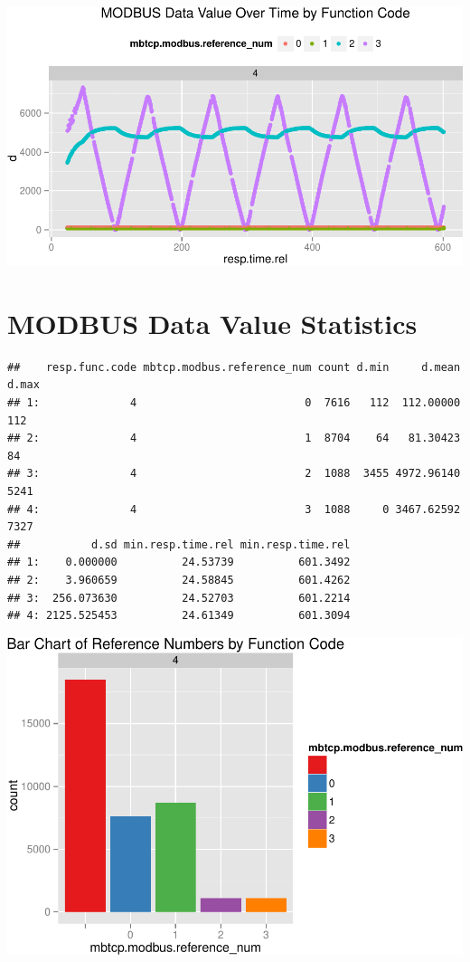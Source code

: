 \documentclass[]{article}
\begin{document}
\includegraphics{modbus_files/figure-latex/unnamed-chunk-17-1.pdf}

\pagebreak

\section{MODBUS Data Value
Statistics}\label{modbus-data-value-statistics}

\begin{verbatim}
##    resp.func.code mbtcp.modbus.reference_num count d.min     d.mean d.max
## 1:              4                          0  7616   112  112.00000   112
## 2:              4                          1  8704    64   81.30423    84
## 3:              4                          2  1088  3455 4972.96140  5241
## 4:              4                          3  1088     0 3467.62592  7327
##           d.sd min.resp.time.rel min.resp.time.rel
## 1:    0.000000          24.53739          601.3492
## 2:    3.960659          24.58845          601.4262
## 3:  256.073630          24.52703          601.2214
## 4: 2125.525453          24.61349          601.3094
\end{verbatim}

\includegraphics{modbus_files/figure-latex/unnamed-chunk-19-1.pdf}
\end{document}
